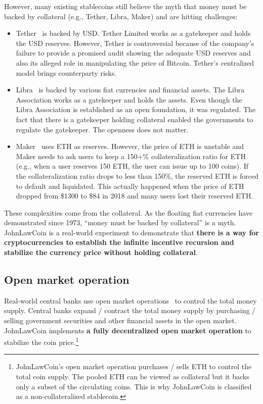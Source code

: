 \documentclass[dvipdfmx,a4paper]{article}
\begin{document}
However, many existing stablecoins still believe the myth that money must be backed by collateral (e.g., Tether, Libra, Maker) and are hitting challenges:

\begin{itemize}
\item Tether~\cite{tether} is backed by USD. Tether Limited works as a gatekeeper and holds the USD reserves. However, Tether is controversial because of the company's failure to provide a promised audit showing the adequate USD reserves and also its alleged role in manipulating the price of Bitcoin. Tether's centralized model brings counterparty risks.
\item Libra~\cite{libra} is backed by various fiat currencies and financial assets. The Libra Association works as a gatekeeper and holds the assets. Even though the Libra Association is established as an open foundation, it was regulated. The fact that there is a gatekeeper holding collateral enabled the governments to regulate the gatekeeper. The openness does not matter.
\item Maker~\cite{makerdao} uses ETH as reserves. However, the price of ETH is unstable and Maker needs to ask users to keep a 150+\% collateralization ratio for ETH (e.g., when a user reserves 150 ETH, the user can issue up to 100 coins). If the collateralization ratio drops to less than 150\%, the reserved ETH is forced to default and liquidated. This actually happened when the price of ETH dropped from \$1300 to \$84 in 2018 and many users lost their reserved ETH.
\end{itemize}

These complexities come from the collateral. As the floating fiat currencies have demonstrated since 1973, ``money must be backed by collateral'' is a myth. JohnLawCoin is a real-world experiment to demonstrate that \textbf{there is a way for cryptocurrencies to establish the infinite incentive recursion and stabilize the currency price without holding collateral}.

\subsection{Open market operation}

Real-world central banks use open market operations~\cite{ayuso2003model} to control the total money supply. Central banks expand / contract the total money supply by purchasing / selling government securities and other financial assets in the open market. JohnLawCoin implements \textbf{a fully decentralized open market operation} to stabilize the coin price.\footnote{JohnLawCoin's open market operation purchases / sells ETH to control the total coin supply. The pooled ETH can be viewed as collateral but it backs only a subset of the circulating coins. This is why JohnLawCoin is classified as a non-collateralized stablecoin.}
\end{document}
